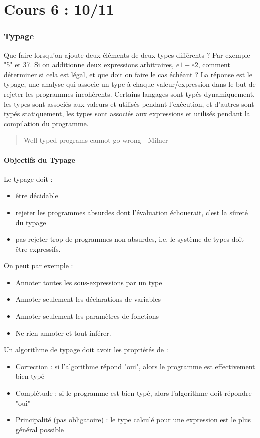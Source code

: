 \documentclass{cours}
\begin{document}
\newpage
\part[Typage]{Cours 6 : 10/11}
\localtableofcontents
\section{Typage}
Que faire lorsqu'on ajoute deux éléments de deux types différents ? Par exemple "5" et 37.
Si on additionne deux expressions arbitraires, $e1 + e2$, comment déterminer si cela est légal, et que doit on faire le cas échéant ? La réponse est le typage, une analyse qui associe un type à chaque valeur/expression dans le but de rejeter les programmes incohérents.
Certains langages sont typés dynamiquement, les types sont associés aux valeurs et utilisés pendant l'exécution, et d'autres sont typés statiquement, les types sont associés aux expressions et utilisés pendant la compilation du programme.

\begin{quotation}
    Well typed programs cannot go wrong - Milner
\end{quotation}

\subsection{Objectifs du Typage}
Le typage doit  :
\begin{itemize}
    \item être décidable
    \item rejeter les programmes absurdes dont l'évaluation échouerait, c'est la sûreté du typage
    \item pas rejeter trop de programmes non-absurdes, i.e. le système de types doit être expressifs.
\end{itemize}

On peut par exemple :
\begin{itemize}
    \item Annoter toutes les sous-expressions par un type
    \item Annoter seulement les déclarations de variables
    \item Annoter seulement les paramètres de fonctions
    \item Ne rien annoter et tout inférer.
\end{itemize}

Un algorithme de typage doit avoir les propriétés de :
\begin{itemize}
    \item Correction : si l'algorithme répond "oui", alors le programme est effectivement bien typé
    \item Complétude : si le programme est bien typé, alors l'algorithme doit répondre "oui"
    \item Principalité (pas obligatoire) : le type calculé pour une expression est le plus général possible
\end{itemize}
\end{document}
